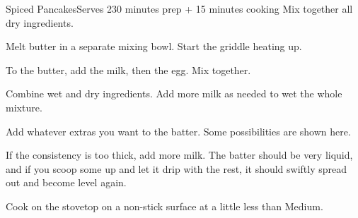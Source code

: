 \documentclass[../Cookbook.tex]{subfiles}
\begin{document}
\begin{recipe}{Spiced Pancakes}{Serves 2}{30 minutes prep + 15 minutes cooking}
	Mix together all dry ingredients.

	Melt butter in a separate mixing bowl. Start the griddle heating up.

	To the butter, add the milk, then the egg. Mix together.

	Combine wet and dry ingredients. Add more milk as needed to wet the whole mixture.

	Add whatever extras you want to the batter. Some possibilities are shown here.
	
	If the consistency is too thick, add more milk. The batter should be very liquid, and if you scoop some up and let it drip with the rest, it should swiftly spread out and become level again.

	\newstep
	Cook on the stovetop on a non-stick surface at a little less than Medium.
\end{recipe}
\end{document}
